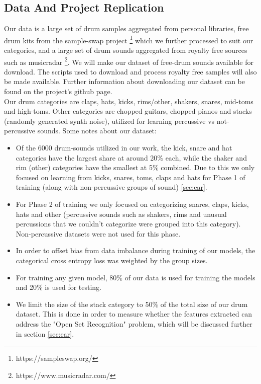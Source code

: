 \documentclass{nime-alternate} %
\begin{document}
\subsection{Data And Project Replication}
\label{data}
Our data is a large set of drum samples aggregated from personal libraries, free drum kits from the sample-swap project \footnote{https://sampleswap.org/} which we further processed to suit our categories, and a large set of drum sounds aggregated from royalty free sources such as musicradar \footnote{https://www.musicradar.com/}. We will make our dataset of free-drum sounds available for download. The scripts used to download and process royalty free samples will also be made available. Further information about downloading our dataset can be found on the project's github page. \\
Our drum categories are claps, hats, kicks, rims/other, shakers, snares, mid-toms and high-toms. Other categories are chopped guitars, chopped pianos and stacks (randomly generated synth noise), utilized for learning percussive vs not-percussive sounds. Some notes about our dataset:
\begin{itemize}
\item Of the 6000 drum-sounds utilized in our work, the kick, snare and hat categories have the largest share at around 20\% each, while the shaker and rim (other) categories have the smallest at 5\% combined. Due to this we only focused on learning from kicks, snares, toms, claps and hats for Phase 1 of training (along with non-percussive groups of sound) \ref{sec:ear}.
\item For Phase 2 of training we only focused on categorizing snares, claps, kicks, hats and other (percussive sounds such as shakers, rims and unusual percussions that we couldn't categorize were grouped into this category). Non-percussive datasets were not used for this phase. 
\item In order to offset bias from data imbalance during training of our models, the categorical cross entropy loss was weighted by the group sizes. 
\item For training any given model, 80\% of our data is used for training the models and 20\% is used for testing. 
\item We limit the size of the stack category to 50\% of the total size of our drum dataset. This is done in order to measure whether the features extracted can address the "Open Set Recognition" problem, which will be discussed further in section \ref{sec:ear}.
\end{itemize}
\end{document}
